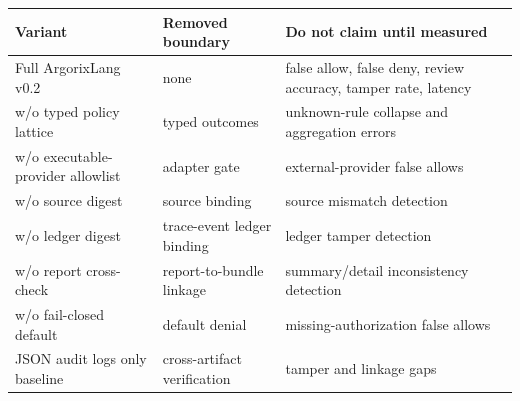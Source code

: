 \begin{tabularx}{\linewidth}{@{}XXX@{}}
\toprule
Variant & Removed boundary & Do not claim until measured \\
\midrule
Full ArgorixLang v0.2 & none & false allow, false deny, review accuracy, tamper rate, latency \\
w/o typed policy lattice & typed outcomes & unknown-rule collapse and aggregation errors \\
w/o executable-provider allowlist & adapter gate & external-provider false allows \\
w/o source digest & source binding & source mismatch detection \\
w/o ledger digest & trace-event ledger binding & ledger tamper detection \\
w/o report cross-check & report-to-bundle linkage & summary/detail inconsistency detection \\
w/o fail-closed default & default denial & missing-authorization false allows \\
JSON audit logs only baseline & cross-artifact verification & tamper and linkage gaps \\
\bottomrule
\end{tabularx}
